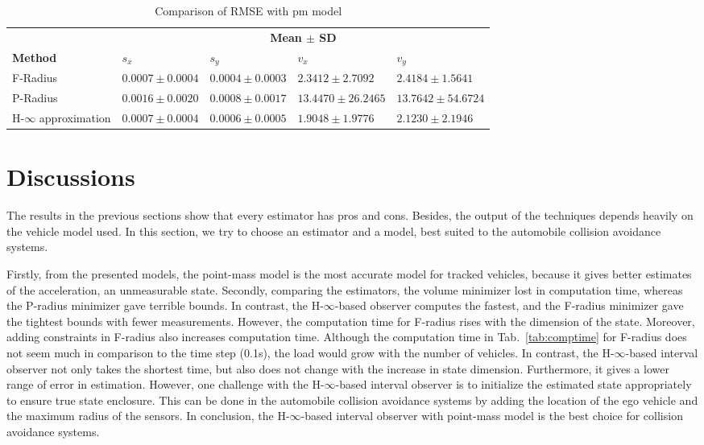 \begin{table}[!h]
\caption{Comparison of RMSE with pm model}
	\centering
	\renewcommand{\arraystretch}{1.1}
	\small	
	\begin{tabular}{l l l l l}
		\toprule 
		& \multicolumn{4}{c}{\textbf{Mean $\pm$ SD}} \\ \cmidrule{2-5}
		\textbf{Method} & \textbf{$s_x$} & \textbf{$s_y$} & \textbf{$v_x$} & \textbf{$v_y$}\\ \midrule
		F-Radius & $0.0007\pm 0.0004$ &  $0.0004  \pm 0.0003$ &  $2.3412 \pm 2.7092$ &   $2.4184 \pm 1.5641$ \\
		P-Radius & $0.0016 \pm 0.0020$ &   $0.0008 \pm 0.0017$  & $13.4470 \pm 26.2465$ &  $13.7642 \pm 54.6724$\\
		H-$\infty$ approximation & $0.0007 \pm 0.0004$ &  $0.0006 \pm 0.0005$   & $1.9048 \pm  1.9776$  &  $ 2.1230 \pm  2.1946$\\
		\bottomrule
	\end{tabular}
	\label{tab:errormean}
\end{table}

\section{Discussions}
The results in the previous sections show that every estimator has pros and cons. Besides, the output of the techniques depends heavily on the vehicle model used. In this section, we try to choose an estimator and a model, best suited to the automobile collision avoidance systems. 

Firstly, from the presented models, the point-mass model is the most accurate model for tracked vehicles, because it gives better estimates of the acceleration, an unmeasurable state. Secondly, comparing the estimators, the volume minimizer lost in computation time, whereas the P-radius minimizer gave terrible bounds. In contrast, the H-$\infty$-based observer computes the fastest, and the F-radius minimizer gave the tightest bounds with fewer measurements. However, the computation time for F-radius rises with the dimension of the state. Moreover, adding constraints in F-radius also increases computation time. Although the computation time in Tab.~\ref{tab:comptime} for F-radius does not seem much in comparison to the time step (0.1s), the load would grow with the number of vehicles. In contrast, the H-$\infty$-based interval observer not only takes the shortest time, but also does not change with the increase in state dimension. Furthermore, it gives a lower range of error in estimation. However, one challenge with the H-$\infty$-based interval observer is to initialize the estimated state appropriately to ensure true state enclosure. This can be done in the automobile collision avoidance systems by adding the location of the ego vehicle and the maximum radius of the sensors. In conclusion, the H-$\infty$-based interval observer with point-mass model is the best choice for collision avoidance systems. 

